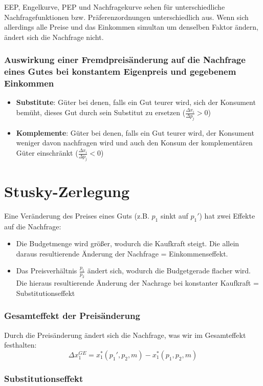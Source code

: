 EEP, Engelkurve, PEP und Nachfragekurve sehen für unterschiedliche Nachfragefunktionen bzw. Präferenzordnungen unterschiedlich aus. Wenn sich allerdings alle Preise und das Einkommen simultan um denselben Faktor ändern, ändert sich die Nachfrage nicht.

\subsubsection*{Auswirkung einer Fremdpreisänderung auf die Nachfrage eines Gutes bei konstantem Eigenpreis und gegebenem Einkommen}

\begin{itemize}
	\item \textbf{Substitute}: Güter bei denen, falls ein Gut teurer wird, sich der  Konsument bemüht, dieses Gut durch sein Substitut zu ersetzen ($\frac{\Delta x_i}{\Delta p_j} > 0$)
	\item \textbf{Komplemente}: Güter bei denen, falls ein Gut teurer wird, der Konsument weniger davon nachfragen wird und auch den Konsum der komplementären Güter einschränkt ($\frac{\Delta x_i}{\Delta p_j} < 0$)
\end{itemize}
\section{Stusky-Zerlegung}

Eine Veränderung des Preises eines Guts (z.B. $p_1$ sinkt auf $p_1'$) hat zwei Effekte auf die Nachfrage:
\begin{itemize}
	\item Die Budgetmenge wird größer, wodurch die Kaufkraft steigt. Die allein daraus resultierende Änderung der Nachfrage = Einkommenseffekt.
	\item Das Preisverhältnis $\frac{p_1}{p_2}$ ändert sich, wodurch die Budgetgerade flacher wird. Die hieraus  resultierende Änderung der Nachrage bei konstanter Kaufkraft = Substitutionseffekt
\end{itemize}

\subsubsection*{Gesamteffekt der Preisänderung}

Durch die Preisänderung ändert sich die Nachfrage, was wir im Gesamteffekt festhalten:
	$$ \Delta x_1^{GE} = x_1^{*}(p_1', p_2, m) - x_1^*(p_1, p_2, m) $$
	
\subsubsection*{Substitutionseffekt}

